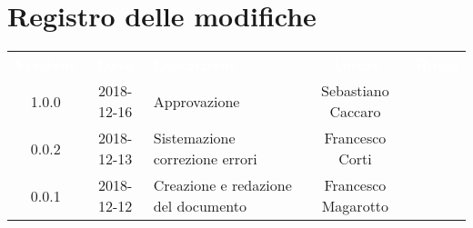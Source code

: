\section*{Registro delle modifiche}
{
	\renewcommand{\arraystretch}{1.5}
	\centering
	\begin{longtable}{ c c  C{4cm}  c  c }
		
		\textcolor{white}{\textbf{Versione}} & \textcolor{white}{\textbf{Data}} & \textcolor{white}{\textbf{Descrizione}} & \textcolor{white}{\textbf{Autore}} & \textcolor{white}{\textbf{Ruolo}}\\	
		
		1.0.0 & 2018-12-16 & Approvazione & Sebastiano Caccaro & \Res{} \\
		
		0.0.2 & 2018-12-13 & Sistemazione correzione errori & Francesco Corti & \ver{} \\
		
		0.0.1 & 2018-12-12 & Creazione e redazione del documento & Francesco Magarotto & \reda{} \\
		
	\end{longtable}

}